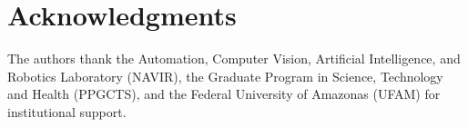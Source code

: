 \section*{Acknowledgments}

The authors thank the Automation, Computer Vision, Artificial Intelligence, and Robotics Laboratory (NAVIR), the Graduate Program in Science, Technology and Health (PPGCTS), and the Federal University of Amazonas (UFAM) for institutional support.
